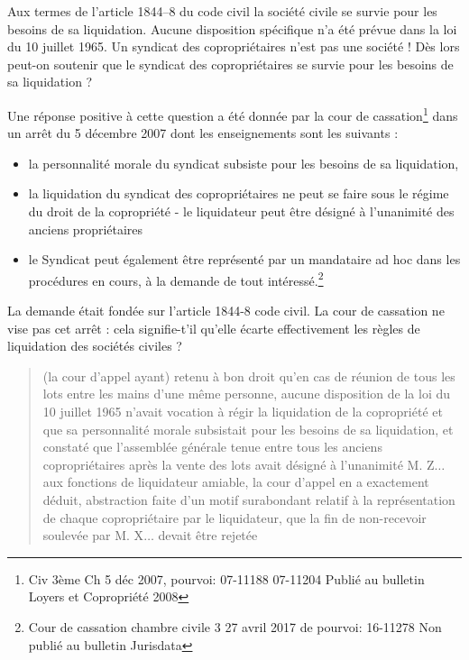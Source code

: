 			\medskip
			
			Aux termes de l’article 1844–8 du code civil la société civile se survie pour les besoins de sa liquidation. Aucune disposition spécifique n’a été prévue dans la loi du 10 juillet 1965. Un syndicat des copropriétaires n’est pas une société ! Dès lors peut-on soutenir que le syndicat des copropriétaires se survie pour les besoins de sa liquidation ?
			
			\medskip
			
			Une réponse positive à cette question a été donnée par la cour de cassation\footnote{Civ 3ème Ch 5 déc 2007, pourvoi: 07-11188 07-11204 Publié au bulletin Loyers et Copropriété 2008 } dans un arrêt du 5 décembre 2007 dont les enseignements sont les suivants :
			\begin{itemize}
				\item la personnalité morale du syndicat subsiste pour les besoins de sa liquidation,
				\item la liquidation du syndicat des copropriétaires ne peut se faire sous le régime du droit de la copropriété - le liquidateur peut être désigné à l’unanimité des anciens propriétaires
				\item le Syndicat peut également être représenté par un mandataire ad hoc dans les procédures en cours, à la demande de tout intéressé.\footnote{Cour de cassation chambre civile 3 27 avril 2017 \no de pourvoi: 16-11278 Non publié au bulletin Jurisdata}
			\end{itemize}
			La demande était fondée sur l’article 1844-8 code civil. La cour de cassation ne vise pas cet arrêt : cela signifie-t’il qu’elle écarte effectivement les règles de liquidation des sociétés civiles ?
			
			\begin{quote}
				(la cour d’appel ayant) retenu à bon droit qu'en cas de réunion de tous les lots entre les mains d'une même personne, aucune disposition de la loi du 10 juillet 1965 n'avait vocation à régir la liquidation de la copropriété et que sa personnalité morale subsistait pour les besoins de sa liquidation, et constaté que l'assemblée générale tenue entre tous les anciens copropriétaires après la vente des lots avait désigné à l'unanimité M. Z$\dots$ aux fonctions de liquidateur amiable, la cour d'appel en a exactement déduit, abstraction faite d'un motif surabondant relatif à la représentation de chaque copropriétaire par le liquidateur, que la fin de non-recevoir soulevée par M. X$\dots$ devait être rejetée
			\end{quote}
			
